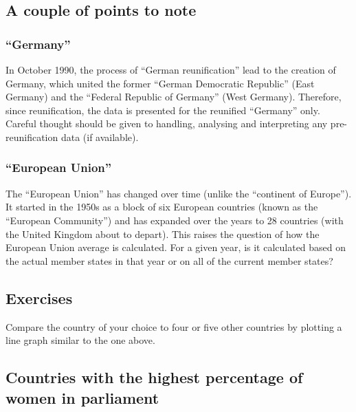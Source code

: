 \documentclass[a4paper,9pt,twocolumn,twoside,]{pinp}
\begin{document}
\hypertarget{a-couple-of-points-to-note}{%
\subsection{A couple of points to
note}\label{a-couple-of-points-to-note}}

\hypertarget{germany}{%
\subsubsection{``Germany''}\label{germany}}

In October 1990, the process of ``German reunification'' lead to the
creation of Germany, which united the former ``German Democratic
Republic'' (East Germany) and the ``Federal Republic of Germany'' (West
Germany). Therefore, since reunification, the data is presented for the
reunified ``Germany'' only. Careful thought should be given to handling,
analysing and interpreting any pre-reunification data (if available).

\hypertarget{european-union}{%
\subsubsection{``European Union''}\label{european-union}}

The ``European Union'' has changed over time (unlike the ``continent of
Europe''). It started in the 1950s as a block of six European countries
(known as the ``European Community'') and has expanded over the years to
28 countries (with the United Kingdom about to depart). This raises the
question of how the European Union average is calculated. For a given
year, is it calculated based on the actual member states in that year or
on all of the current member states?

\hypertarget{exercises}{%
\subsection{Exercises}\label{exercises}}

Compare the country of your choice to four or five other countries by
plotting a line graph similar to the one above.

\hypertarget{countries-with-the-highest-percentage-of-women-in-parliament}{%
\subsection{Countries with the highest percentage of women in
parliament}\label{countries-with-the-highest-percentage-of-women-in-parliament}}
\end{document}
